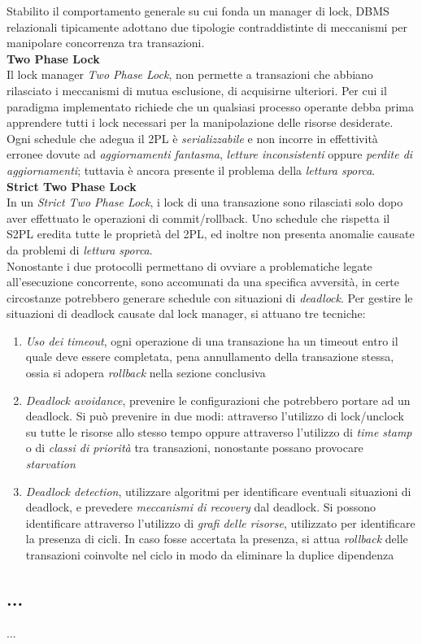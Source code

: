 \documentclass{article}
\begin{document}
Stabilito il comportamento generale su cui fonda un manager di lock, DBMS relazionali tipicamente adottano due tipologie contraddistinte di meccanismi per manipolare concorrenza tra transazioni.\vspace*{14pt}\\
\textbf{Two Phase Lock}\\
Il lock manager \textit{Two Phase Lock}, non permette a transazioni che abbiano rilasciato i meccanismi di mutua esclusione, di acquisirne ulteriori. Per cui il paradigma implementato richiede che un qualsiasi processo operante debba prima apprendere tutti i lock necessari per la manipolazione delle risorse desiderate. Ogni schedule che adegua il 2PL è \textit{serializzabile} e non incorre in effettività erronee dovute ad \textit{aggiornamenti fantasma}, \textit{letture inconsistenti} oppure \textit{perdite di aggiornamenti}; tuttavia è ancora presente il problema della \textit{lettura sporca}.\vspace*{14pt}\\
\textbf{Strict Two Phase Lock}\\
In un \textit{Strict Two Phase Lock}, i lock di una transazione sono rilasciati solo dopo aver effettuato le operazioni di commit/rollback.
Uno schedule che rispetta il S2PL eredita tutte le proprietà del 2PL, ed inoltre non presenta anomalie causate da problemi di \textit{lettura sporca}.\vspace{14pt}\\
Nonostante i due protocolli permettano di ovviare a problematiche legate all'esecuzione concorrente, sono accomunati da una specifica avversità, in certe circostanze potrebbero generare schedule con situazioni di \textit{deadlock}. Per gestire le situazioni di deadlock causate dal lock manager, si attuano tre tecniche:
\begin{enumerate}[label={-}]
    \item \textit{Uso dei timeout}, ogni operazione di una transazione ha un timeout entro il quale deve essere completata, pena annullamento della transazione stessa, ossia si adopera \textit{rollback} nella sezione conclusiva
    \item \textit{Deadlock avoidance}, prevenire le configurazioni che potrebbero portare ad un deadlock. Si può prevenire in due modi: attraverso l'utilizzo di lock/unclock su tutte le risorse allo stesso tempo oppure attraverso l'utilizzo di \textit{time stamp} o di \textit{classi di priorità} tra transazioni, nonostante possano provocare \textit{starvation}
    \item \textit{Deadlock detection}, utilizzare algoritmi per identificare eventuali situazioni di deadlock, e prevedere \textit{meccanismi di recovery} dal deadlock. Si possono identificare attraverso l'utilizzo di \textit{grafi delle risorse}, utilizzato per identificare la presenza di cicli. In caso fosse accertata la presenza, si attua \textit{rollback} delle transazioni coinvolte nel ciclo in modo da eliminare la duplice dipendenza
\end{enumerate}

\subsection*{...}
\large
...
\end{document}
